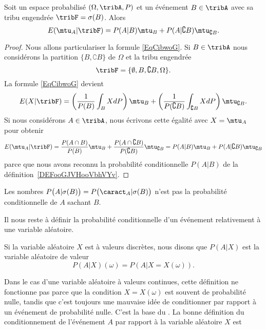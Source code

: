 \begin{proposition}
    Soit un espace probabilisé \( (\Omega,\tribA,P)\) et un événement \( B\in\tribA\) avec sa tribu engendrée \( \tribF=\sigma(B)\). Alors
    \begin{equation}
        E(\mtu_A|\tribF)=P(A|B)\mtu_B+P(A|\complement B)\mtu_{\complement B}.
    \end{equation}
\end{proposition}

\begin{proof}
    Nous allons particulariser la formule \eqref{EqCibwoG}. Si \( B\in \tribA\) nous considérons la partition \( \{ B,\complement B \}\) de \( \Omega\) et la tribu engendrée
    \begin{equation}
        \tribF=\{ \emptyset,B,\complement B,\Omega \}.
    \end{equation}
    La formule \eqref{EqCibwoG} devient
    \begin{equation}
        E(X|\tribF)=\left( \frac{1}{ P(B) }\int_BXdP \right)\mtu_B+\left( \frac{1}{ P(\complement B) }\int_{\complement B}XdP \right)\mtu_{\complement B}.
    \end{equation}
    Si nous considérons \( A\in\tribA\), nous écrivons cette égalité avec \( X=\mtu_A\) pour obtenir
    \begin{equation}
            E(\mtu_A|\tribF)=\frac{ P(A\cap B) }{ P(B) }\mtu_B+\frac{ P(A\cap\complement B) }{ P(\complement B) }\mtu_{\complement B} =P(A|B)\mtu_B+P(A|\complement B)\mtu_{\complement B}
    \end{equation}
    parce que nous avons reconnu la probabilité conditionnelle \( P(A|B)\) de la définition~\ref{DEFooGJVHooVbhVYv}.
\end{proof}

\begin{remark}
    Les nombres \(P\big( A |\sigma(B) \big)=P\big(\caract_A|\sigma(B)\big)\) n'est pas la probabilité conditionnelle de \( A\) sachant \( B\).
\end{remark}



Il nous reste à définir la probabilité conditionnelle d'un événement relativement à une variable aléatoire.

\begin{definition}      \label{DEFooFRLFooNvXuPK}
    Si la variable aléatoire \( X\) est à valeurs discrètes, nous disons que \( P(A|X)\) est la variable aléatoire de valeur
    \begin{equation}
        P(A|X)(\omega)=P(A|X=X(\omega)).
    \end{equation}
\end{definition}
Dans le cas d'une variable aléatoire à valeurs continues, cette définition ne fonctionne pas parce que la condition \( X=X(\omega)\) est souvent de probabilité nulle, tandis que c'est toujours une mauvaise idée de conditionner par rapport à un événement de probabilité nulle. C'est la base du . La bonne définition du conditionnement de l'événement \( A\) par rapport à la variable aléatoire $X$ est

